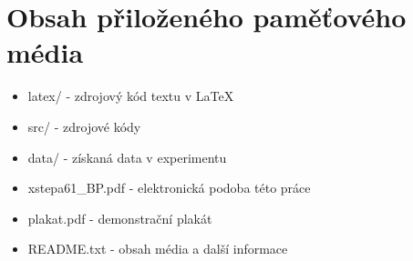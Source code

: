 
\chapter{Obsah přiloženého paměťového média}

\begin{itemize}
    \item latex/ - zdrojový kód textu v \LaTeX
    \item src/ - zdrojové kódy
    \item data/ - získaná data v experimentu
    \item xstepa61\_BP.pdf - elektronická podoba této práce
    \item plakat.pdf - demonstrační plakát
    \item README.txt - obsah média a další informace
\end{itemize}

